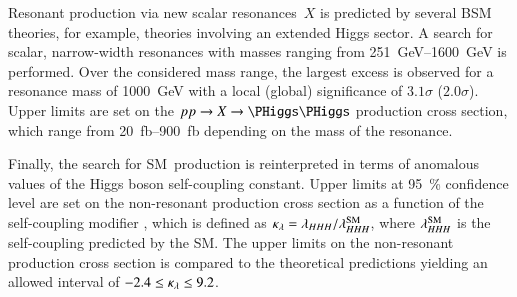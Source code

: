 Resonant \HH production via new scalar resonances~$X$ is predicted by several
BSM theories, for example, theories involving an extended Higgs sector. A search
for scalar, narrow-width resonances with masses ranging from
\SIrange{251}{1600}{\GeV} is performed. Over the considered mass range, the
largest excess is observed for a resonance mass of \SI{1000}{\GeV} with a local
(global) significance of $3.1\sigma$ ($2.0\sigma$). Upper limits are set on the
$\pp \to X \to \HH$ production cross section, which range from
\SIrange{20}{900}{\femto\barn} depending on the mass of the resonance.

Finally, the search for SM~\HH production is reinterpreted in terms of anomalous
values of the Higgs boson self-coupling constant. Upper limits at
\SI{95}{\percent} confidence level are set on the non-resonant \HH production
cross section as a function of the self-coupling modifier \klambda, which is
defined as $\kappa_{\lambda} = \lambda_{HHH} / \lambda_{HHH}^{\text{SM}}$, where
$\lambda_{HHH}^{\text{SM}}$ is the self-coupling predicted by the SM. The upper
limits on the non-resonant \HH production cross section is compared to the
theoretical predictions yielding an allowed \klambda interval of
$\num{-2.4} \leq \kappa_{\lambda} \leq 9.2$.

%


